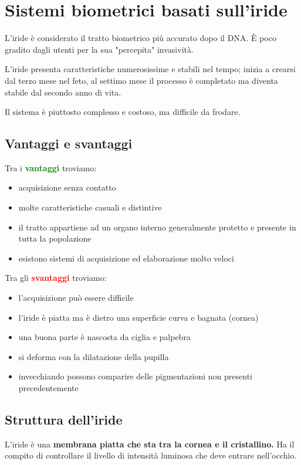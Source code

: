 \chapter{Sistemi biometrici basati sull'iride}

L'iride è considerato il tratto biometrico più accurato
dopo il DNA. È poco gradito dagli utenti per la sua
"percepita" invasività.

\noindent L'iride presenta caratteristiche numerosissime e stabili 
nel tempo; inizia a crearsi dal terzo mese nel feto, al settimo mese 
il processo è completato ma diventa stabile dal secondo anno di vita.

\noindent Il sistema è piuttosto complesso e costoso, ma difficile da frodare.

\section{Vantaggi e svantaggi}

Tra i \textbf{\textcolor{green}{vantaggi}} troviamo:
\begin{itemize}
    \item acquisizione senza contatto
    \item molte caratteristiche casuali e distintive
    \item il tratto appartiene ad un organo interno generalmente protetto e presente in tutta la popolazione
    \item esistono sistemi di acquisizione ed elaborazione molto veloci
\end{itemize}
Tra gli \textbf{\textcolor{red}{svantaggi}} troviamo:
\begin{itemize}
    \item l'acquisizione può essere difficile 
    \item l'iride è piatta ma è dietro una superficie curva e bagnata (cornea)
    \item una buona parte è nascosta da ciglia e palpebra
    \item si deforma con la dilatazione della pupilla
    \item invecchiando possono comparire delle pigmentazioni non presenti
    precedentemente
\end{itemize}

\section{Struttura dell'iride}
L'iride è una \textbf{membrana piatta che sta tra la cornea e il cristallino.}
Ha il compito di controllare il livello di intensità luminosa che deve entrare nell'occhio.

